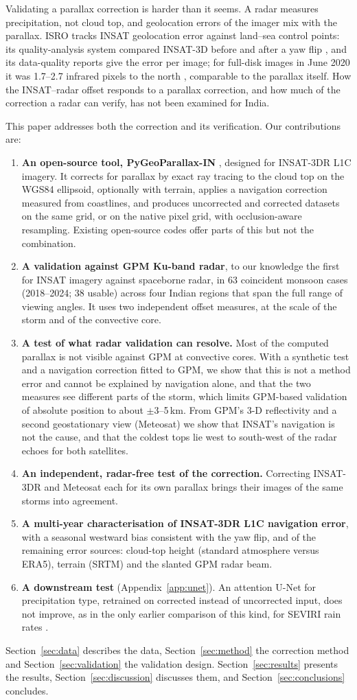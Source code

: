 Validating a parallax correction is harder than it seems. A radar measures precipitation, not cloud top, and geolocation errors of the imager mix with the parallax. ISRO tracks INSAT geolocation error against land--sea control points: its quality-analysis system compared INSAT-3D before and after a yaw flip \citep{jindal2014}, and its data-quality reports give the error per image; for full-disk images in June 2020 it was 1.7--2.7 infrared pixels to the north \citep{mosdac_dqe2020}, comparable to the parallax itself. How the INSAT--radar offset responds to a parallax correction, and how much of the correction a radar can verify, has not been examined for India.

This paper addresses both the correction and its verification. Our contributions are:
\begin{enumerate}
  \item \textbf{An open-source tool, PyGeoParallax-IN} \citep{pygeoparallax}, designed for INSAT-3DR L1C imagery. It corrects for parallax by exact ray tracing to the cloud top on the WGS84 ellipsoid, optionally with terrain, applies a navigation correction measured from coastlines, and produces uncorrected and corrected datasets on the same grid, or on the native pixel grid, with occlusion-aware resampling. Existing open-source codes offer parts of this but not the combination.
  \item \textbf{A validation against GPM Ku-band radar}, to our knowledge the first for INSAT imagery against spaceborne radar, in 63 coincident monsoon cases (2018--2024; 38 usable) across four Indian regions that span the full range of viewing angles. It uses two independent offset measures, at the scale of the storm and of the convective core.
  \item \textbf{A test of what radar validation can resolve.} Most of the computed parallax is not visible against GPM at convective cores. With a synthetic test and a navigation correction fitted to GPM, we show that this is not a method error and cannot be explained by navigation alone, and that the two measures see different parts of the storm, which limits GPM-based validation of absolute position to about $\pm$3--5\,km. From GPM's 3-D reflectivity and a second geostationary view (Meteosat) we show that INSAT's navigation is not the cause, and that the coldest tops lie west to south-west of the radar echoes for both satellites.
  \item \textbf{An independent, radar-free test of the correction.} Correcting INSAT-3DR and Meteosat each for its own parallax brings their images of the same storms into agreement.
  \item \textbf{A multi-year characterisation of INSAT-3DR L1C navigation error}, with a seasonal westward bias consistent with the yaw flip, and of the remaining error sources: cloud-top height (standard atmosphere versus ERA5), terrain (SRTM) and the slanted GPM radar beam.
  \item \textbf{A downstream test} (Appendix~\ref{app:unet}). An attention U-Net for precipitation type, retrained on corrected instead of uncorrected input, does not improve, as in the only earlier comparison of this kind, for SEVIRI rain rates \citep{dadderio2023}.
\end{enumerate}

Section~\ref{sec:data} describes the data, Section~\ref{sec:method} the correction method and Section~\ref{sec:validation} the validation design. Section~\ref{sec:results} presents the results, Section~\ref{sec:discussion} discusses them, and Section~\ref{sec:conclusions} concludes.
